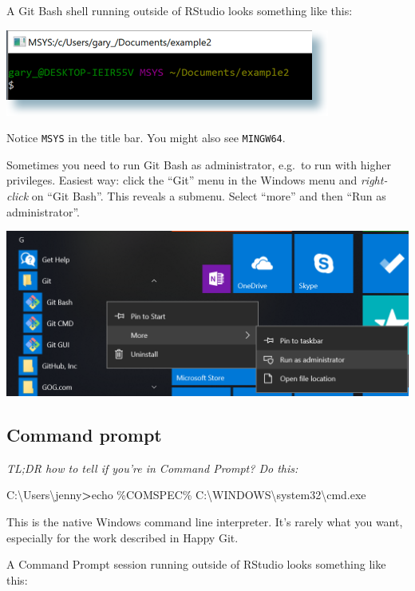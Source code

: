 \documentclass[
]{book}
\newenvironment{Shaded}{\begin{snugshade}}{\end{snugshade}}
\newcommand{\ExtensionTok}[1]{#1}
\newcommand{\NormalTok}[1]{#1}
\newcommand{\OperatorTok}[1]{\textcolor[rgb]{0.81,0.36,0.00}{\textbf{#1}}}
\begin{document}
A Git Bash shell running outside of RStudio looks something like this:

\includegraphics{img/2018-01-15_git-bash.png}

Notice \texttt{MSYS} in the title bar. You might also see \texttt{MINGW64}.

Sometimes you need to run Git Bash as administrator, e.g.~to run with higher privileges. Easiest way: click the ``Git'' menu in the Windows menu and \emph{right-click} on ``Git Bash''. This reveals a submenu. Select ``more'' and then ``Run as administrator''.

\includegraphics{img/2019-01-git-windows-administrator.png}

\subsection{Command prompt}\label{command-prompt}

\emph{TL;DR how to tell if you're in Command Prompt? Do this:}

\begin{Shaded}
\begin{Highlighting}[]
\ExtensionTok{C:\textbackslash{}Users\textbackslash{}jenny}\OperatorTok{\textgreater{}}\NormalTok{echo \%COMSPEC\%}
\ExtensionTok{C:\textbackslash{}WINDOWS\textbackslash{}system32\textbackslash{}cmd.exe}
\end{Highlighting}
\end{Shaded}

This is the native Windows command line interpreter. It's rarely what you want, especially for the work described in Happy Git.

A Command Prompt session running outside of RStudio looks something like this:
\end{document}
